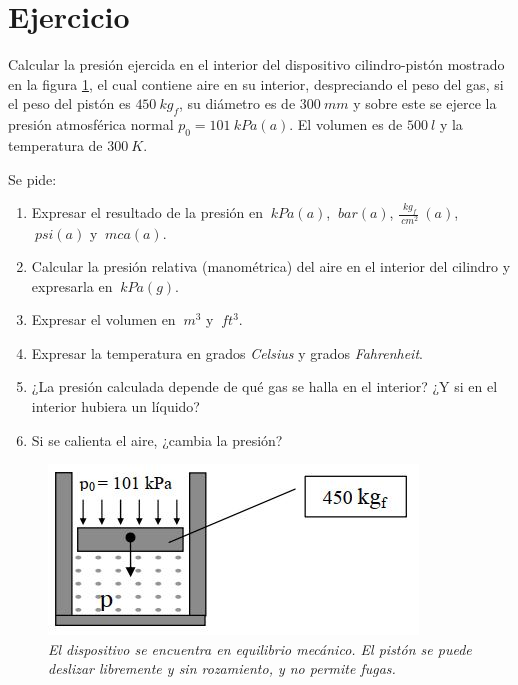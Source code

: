 \section{Ejercicio}\label{ej:Chap01Ejercicio03}
Calcular la presión ejercida en el interior del dispositivo cilindro-pistón mostrado en la figura \ref{im:Chap01-001}, el cual contiene aire en su interior, despreciando el peso del gas, si el peso del pistón es $\SI{450}{kg_f}$, su diámetro es de $\SI{300}{mm}$ y sobre este se ejerce la presión atmosférica normal $p_0=\SI{101}{kPa(a)}$. El volumen es de $\SI{500}{l}$ y la temperatura de $\SI{300}{K}$. 

Se pide:
\begin{enumerate}
\item Expresar el resultado de la presión en $\SI{}{kPa(a)}$, $\SI{}{bar(a)}$, $\frac{\SI{}{kg_f}}{\SI{}{cm^2}}\SI{}{(a)}$, $\SI{}{psi(a)}$ y $\SI{}{mca(a)}$.
\item Calcular la presión relativa (manométrica) del aire en el interior del cilindro y expresarla en $\SI{}{kPa(g)}$.
\item Expresar el volumen en $\SI{}{m^3}$ y $\SI{}{ft^3}$.
\item Expresar la temperatura en grados \textit{Celsius} y grados \textit{Fahrenheit}.
\item ¿La presión calculada depende de qué gas se halla en el interior? ¿Y si en el interior hubiera un líquido?
\item Si se calienta el aire, ¿cambia la presión?
\end{enumerate}

\begin{figure}[ht]
\centerline{\includegraphics[scale=0.6]{001.jpg}}
\caption{\textit{El dispositivo se encuentra en equilibrio mecánico. El pistón se puede deslizar libremente y sin rozamiento, y no permite fugas.}}
\label{im:Chap01-001}
\end{figure}